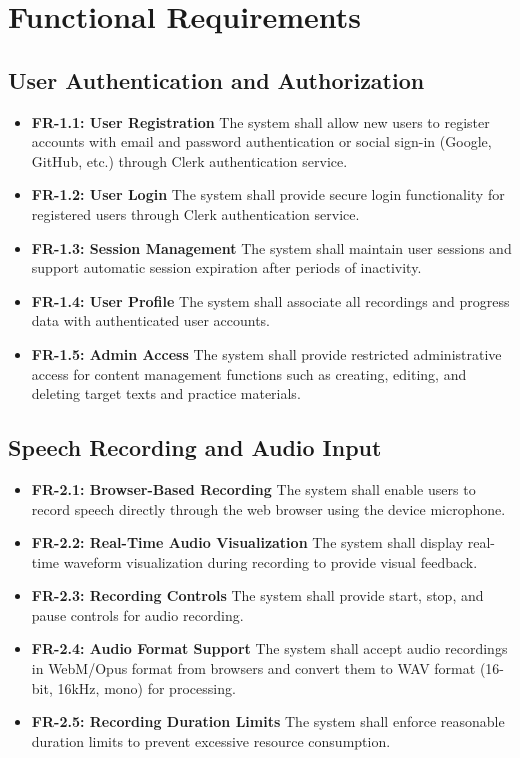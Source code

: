 \documentclass[a4paper,12pt]{report}
\begin{document}
\section{Functional Requirements}

\subsection{User Authentication and Authorization}
\begin{itemize}
    \item \textbf{FR-1.1: User Registration} The system shall allow new users to register accounts with email and password authentication or social sign-in (Google, GitHub, etc.) through Clerk authentication service.
    \item \textbf{FR-1.2: User Login} The system shall provide secure login functionality for registered users through Clerk authentication service.
    \item \textbf{FR-1.3: Session Management} The system shall maintain user sessions and support automatic session expiration after periods of inactivity.
    \item \textbf{FR-1.4: User Profile} The system shall associate all recordings and progress data with authenticated user accounts.
    \item \textbf{FR-1.5: Admin Access} The system shall provide restricted administrative access for content management functions such as creating, editing, and deleting target texts and practice materials.
\end{itemize}

\subsection{Speech Recording and Audio Input}
\begin{itemize}
    \item \textbf{FR-2.1: Browser-Based Recording} The system shall enable users to record speech directly through the web browser using the device microphone.
    \item \textbf{FR-2.2: Real-Time Audio Visualization} The system shall display real-time waveform visualization during recording to provide visual feedback.
    \item \textbf{FR-2.3: Recording Controls} The system shall provide start, stop, and pause controls for audio recording.
    \item \textbf{FR-2.4: Audio Format Support} The system shall accept audio recordings in WebM/Opus format from browsers and convert them to WAV format (16-bit, 16kHz, mono) for processing.
    \item \textbf{FR-2.5: Recording Duration Limits} The system shall enforce reasonable duration limits to prevent excessive resource consumption.
\end{itemize}
\end{document}
